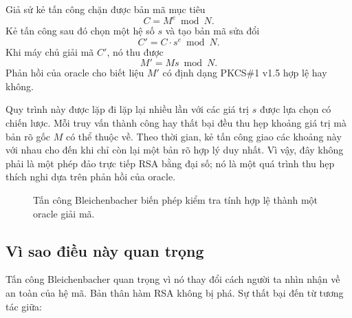 Giả sử kẻ tấn công chặn được bản mã mục tiêu
\[
C = M^e \bmod N.
\]
Kẻ tấn công sau đó chọn một hệ số $s$ và tạo bản mã sửa đổi
\[
C' = C \cdot s^e \bmod N.
\]
Khi máy chủ giải mã $C'$, nó thu được
\[
M' = Ms \bmod N.
\]
Phản hồi của oracle cho biết liệu $M'$ có định dạng PKCS\#1 v1.5 hợp lệ hay không.

Quy trình này được lặp đi lặp lại nhiều lần với các giá trị $s$ được lựa chọn có chiến lược. Mỗi truy vấn thành công hay thất bại đều thu hẹp khoảng giá trị mà bản rõ gốc $M$ có thể thuộc về. Theo thời gian, kẻ tấn công giao các khoảng này với nhau cho đến khi chỉ còn lại một bản rõ hợp lý duy nhất. Vì vậy, đây không phải là một phép đảo trực tiếp RSA bằng đại số; nó là một quá trình thu hẹp thích nghi dựa trên phản hồi của oracle.

\begin{figure}[h]
\centering
{}

\vspace{0.5em}

\caption{Tấn công Bleichenbacher biến phép kiểm tra tính hợp lệ thành một oracle giải mã.}
\end{figure}

\subsection{Vì sao điều này quan trọng}

Tấn công Bleichenbacher quan trọng vì nó thay đổi cách người ta nhìn nhận về an toàn của hệ mã. Bản thân hàm RSA không bị phá. Sự thất bại đến từ tương tác giữa:

